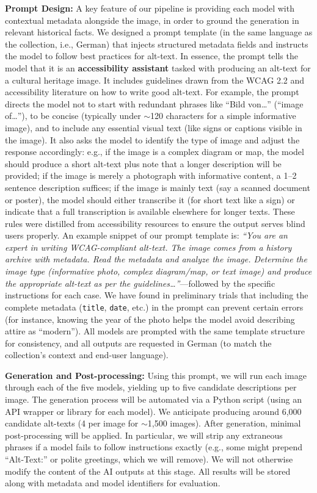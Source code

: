 \documentclass{anthology-ch}         %
\begin{document}
\textbf{Prompt Design:} A key feature of our pipeline is providing each model with contextual metadata alongside the image, in order to ground the generation in relevant historical facts. We designed a prompt template (in the same language as the collection, i.e., German) that injects structured metadata fields and instructs the model to follow best practices for alt-text. In essence, the prompt tells the model that it is an \textbf{accessibility assistant} tasked with producing an alt-text for a cultural heritage image. It includes guidelines drawn from the WCAG 2.2 and accessibility literature on how to write good alt-text. For example, the prompt directs the model not to start with redundant phrases like ``Bild von\ldots'' (``image of\ldots''), to be concise (typically under $\sim$120 characters for a simple informative image), and to include any essential visual text (like signs or captions visible in the image). It also asks the model to identify the type of image and adjust the response accordingly: e.g., if the image is a complex diagram or map, the model should produce a short alt-text plus note that a longer description will be provided; if the image is merely a photograph with informative content, a 1--2 sentence description suffices; if the image is mainly text (say a scanned document or poster), the model should either transcribe it (for short text like a sign) or indicate that a full transcription is available elsewhere for longer texts. These rules were distilled from accessibility resources \autocite{a11ychecklist,wcag2023} to ensure the output serves blind users properly. An example snippet of our prompt template is: \emph{``You are an expert in writing WCAG-compliant alt-text. The image comes from a history archive with metadata. Read the metadata and analyze the image. Determine the image type (informative photo, complex diagram/map, or text image) and produce the appropriate alt-text as per the guidelines\ldots''}---followed by the specific instructions for each case. We have found in preliminary trials that including the complete metadata (\texttt{title}, \texttt{date}, etc.) in the prompt can prevent certain errors (for instance, knowing the year of the photo helps the model avoid describing attire as ``modern''). All models are prompted with the same template structure for consistency, and all outputs are requested in German (to match the collection’s context and end-user language).

\textbf{Generation and Post-processing:} Using this prompt, we will run each image through each of the five models, yielding up to five candidate descriptions per image. The generation process will be automated via a Python script (using an API wrapper or library for each model). We anticipate producing around 6,000 candidate alt-texts (4 per image for $\sim$1,500 images). After generation, minimal post-processing will be applied. In particular, we will strip any extraneous phrases if a model fails to follow instructions exactly (e.g., some might prepend ``Alt-Text:'' or polite greetings, which we will remove). We will not otherwise modify the content of the AI outputs at this stage. All results will be stored along with metadata and model identifiers for evaluation.
\end{document}
